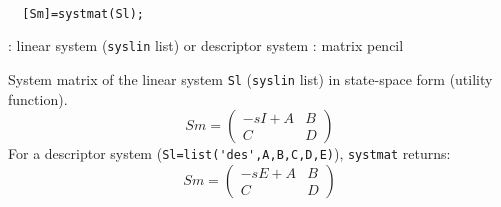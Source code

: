 
\begin{mandesc}
   \\ %
\end{mandesc}
\begin{calling_sequence}
\begin{verbatim}
  [Sm]=systmat(Sl);  
\end{verbatim}
\end{calling_sequence}
\begin{parameters}
  \begin{varlist}
    : linear system (\verb!syslin! list) or descriptor system
    : matrix pencil
  \end{varlist}
\end{parameters}
\begin{mandescription}
  System matrix of the linear system \verb!Sl! (\verb!syslin! list) 
  in state-space form (utility function).
  \begin{equation*}
    Sm = \left( \begin{array}{cl} -s I + A & B \\C & D  \end{array}  \right)
  \end{equation*}
  For a descriptor system (\verb!Sl=list('des',A,B,C,D,E)!), \verb!systmat! returns:
  \begin{equation*}
    Sm = \left( \begin{array}{cl} -s E + A & B \\  C & D   \end{array} \right)
  \end{equation*}
\end{mandescription}
\begin{manseealso}
      
\end{manseealso}
